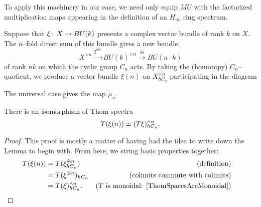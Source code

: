 To apply this machinery in our case, we need only equip $MU$ with the factorized multiplication maps appearing in the definition of an $H_\infty$ ring spectrum.

\begin{definition}
Suppose that $\xi\colon\thinspace X \to BU(k)$ presents a complex vector bundle of rank $k$ on $X$.  The $n$--fold direct sum of this bundle gives a new bundle \[X^{\times n} \xrightarrow{\xi^{\oplus n}} BU(k)^{\times n} \xrightarrow{\oplus} BU(n \cdot k)\] of rank $nk$ on which the cyclic group $C_n$ acts.  By taking the (homotopy) $C_n$--quotient, we produce a vector bundle $\xi(n)$ on $X^{\times n}_{hC_n}$ participating in the diagram
\begin{center}
\end{center}
The universal case gives the map $\widetilde \mu_n$.
\end{definition}

\begin{lemma}
There is an isomorphism of Thom spectra \[T(\xi(n)) \simeq (T\xi)^{\wedge n}_{hC_n}.\]
\end{lemma}
\begin{proof}
This proof is mostly a matter of having had the idea to write down the Lemma to begin with.  From here, we string basic properties together:
\begin{align*}
T(\xi(n)) & = T(\xi^{\oplus n}_{hC_n}) & \text{(definition)} \\
& = T(\xi^{\oplus n})_{hC_n} & \text{(colimits commute with colimits)} \\
& = T(\xi)^{\sm n}_{hC_n}. & \text{($T$ is monoidal: \Cref{ThomSpacesAreMonoidal})} & \qedhere
\end{align*}
\end{proof}

